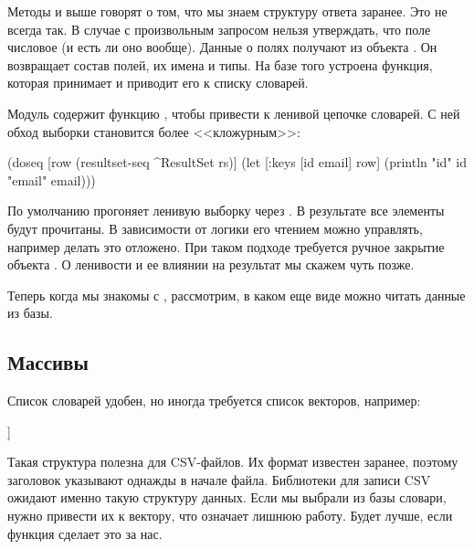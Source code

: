 Методы  и  выше говорят о том, что мы знаем структуру ответа заранее. Это не всегда так. В случае с произвольным запросом нельзя утверждать, что поле  числовое (и есть ли оно вообще). Данные о полях получают из объекта . Он возвращает состав полей, их имена и типы. На базе того устроена функция, которая принимает  и приводит его к списку словарей.

Модуль  содержит функцию , чтобы привести  к ленивой цепочке словарей. С ней обход выборки становится более <<кложурным>>:

\begin{english}
  \begin{clojure}
(doseq [row (resultset-seq ^ResultSet rs)]
  (let [{:keys [id email]} row]
    (println "id" id "email" email)))
  \end{clojure}
\end{english}

По умолчанию  прогоняет ленивую выборку через . В результате все элементы  будут прочитаны. В зависимости от логики его чтением можно управлять, например делать это отложено. При таком подходе требуется ручное закрытие объекта . О ленивости и ее влиянии на результат мы скажем чуть позже.

Теперь когда мы знакомы с , рассмотрим, в каком еще виде можно читать данные из базы.

\subsection{Массивы}

Список словарей удобен, но иногда требуется список векторов, например:

\begin{english}
  \begin{clojure}
[[1 "Ivan" "Petrov" "test@test.com"]
 [2 "Ivan" "Petrov" "ivan@test.com"]
 [3 "John" "Smith" "john@test.com"]]
  \end{clojure}
\end{english}

Такая структура полезна для CSV-файлов. Их формат известен заранее, поэтому заголовок указывают однажды в начале файла. Библиотеки для записи CSV ожидают именно такую структуру данных. Если мы выбрали из базы словари, нужно привести их к вектору, что означает лишнюю работу. Будет лучше, если функция  сделает это за нас.

